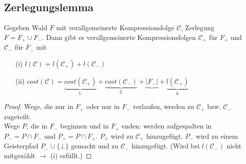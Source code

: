 \subsection{Zerlegungslemma}
Gegeben Wald $F$ mit verallgemeinerte Kompressionsfolge $\mathcal{C}$, Zerlegung $F = F_+ \cup F_-$. Dann gibt es verallgemeinerte Kompressionsfolgen $\mathcal{C}_+$ für $F_+$ und  $\mathcal{C}_-$ für $F_-$ mit 
\begin{enumerate}
\item[(i)] $l(\mathcal{C}) = l(\mathcal{C}_+) +l(\mathcal{C}_-)$
\item[(ii)] $cost(\mathcal{C}) = \underbrace{cost(\mathcal{C}_+)}_{1.} + \underbrace{ cost(\mathcal{C}_-)}_{2.} + \underbrace{ |F_-|} + \underbrace{ l(\mathcal{C}_+)}_{4.}$
\end{enumerate} 
\begin{proof}
Wege, die nur in $F_+$ oder nur in $F_-$ verlaufen, werden zu $\mathcal{C}_+$ bzw. $\mathcal{C}_-$ zugeteilt.\\
Wege $P$, die in $F_-$ beginnen und in $F_+$ enden: werden aufgespalten in $P_- = P \cap F_-$ und $P_+ = P \cap F_+$. $P_+$ wird zu $\mathcal{C}_+$ hinzugefügt. $P_-$ wird zu einem Geisterpfad $P_- \cup \{\bot \}$ gemacht und zu $\mathcal{C}_-$ hinzugefügt. (Wird bei $l(\mathcal{C}_-)$ nicht mitgezählt $\rightarrow$ (i) erfüllt.)
\end{proof}
